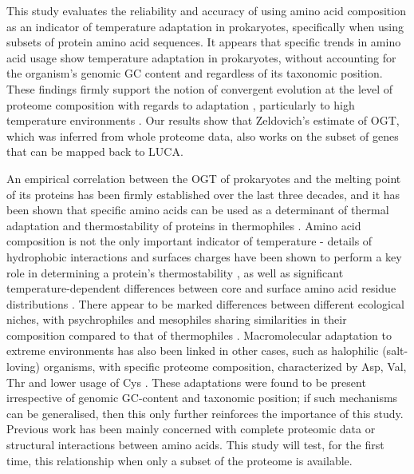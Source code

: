 This study evaluates the reliability and accuracy of using amino acid composition as an indicator of temperature adaptation in prokaryotes, specifically when using subsets of protein amino acid sequences. It appears that specific trends in amino acid usage show temperature adaptation in prokaryotes, without accounting for the organism's genomic GC content and regardless of its taxonomic position. These findings firmly support the notion of convergent evolution at the level of proteome composition with regards to adaptation \cite{johns2004evolutionary}, particularly to high temperature environments \cite{reed2013protein}. Our results show that Zeldovich’s \cite{zeldovich2007} estimate of OGT, which was inferred from whole proteome data, also works on the subset of genes that can be mapped back to LUCA.

An empirical correlation between the OGT of prokaryotes and the melting point of its proteins has been firmly established over the last three decades, \cite{vina2002biochemical,mcfall1990comparative,gromiha1999important} and it has been shown that specific amino acids can be used as a determinant of thermal adaptation \cite{zeldovich2007} and thermostability of proteins in thermophiles \cite{nakashima2003compositional,fukuchi2001protein}. Amino acid composition is not the only important indicator of temperature - details of hydrophobic interactions and surfaces charges have been shown to perform a key role in determining a protein's thermostability \cite{saelensminde2009amino}, as well as significant temperature-dependent differences between core and surface amino acid residue distributions \cite{saelensminde2007structure}. There appear to be marked differences between different ecological niches, with psychrophiles and mesophiles sharing similarities in their composition compared to that of thermophiles \cite{saelensminde2007structure}. Macromolecular adaptation to extreme environments has also been linked in other cases, such as halophilic (salt-loving) organisms, with specific proteome composition, characterized by Asp, Val, Thr and lower usage of Cys \cite{paul2008molecular}. These adaptations were found to be present irrespective of genomic GC-content and taxonomic position; if such mechanisms can be generalised, then this only further reinforces the importance of this study. Previous work has been mainly concerned with complete proteomic data or structural interactions between amino acids. This study will test, for the first time, this relationship when only a subset of the proteome is available.

